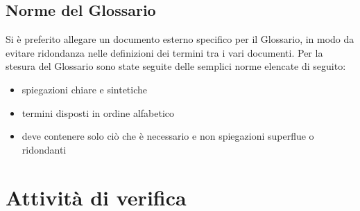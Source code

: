 \documentclass[a4paper,11pt]{article}
\begin{document}
\subsection{Norme del Glossario}
Si \`e preferito allegare un documento esterno specifico per il Glossario, in modo da evitare ridondanza nelle definizioni dei termini tra i vari documenti. Per la stesura del Glossario sono state seguite delle semplici norme elencate di seguito:
\begin{itemize}
\item spiegazioni chiare e sintetiche
\item termini disposti in ordine alfabetico
\item deve contenere solo ci\`o che \`e necessario e non spiegazioni superflue o ridondanti
\end{itemize}

\newpage
\section{Attivit\`a di verifica}
\end{document}
